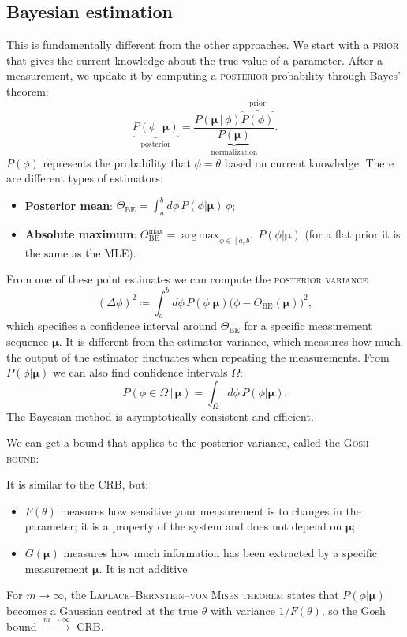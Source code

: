 \documentclass[11pt,a4paper]{article}
\newcommand{\boxedeq}[1]{%
  \par\vspace{0.4\baselineskip}%
  {\centering\keybox{$\displaystyle #1$}\par}%
  \vspace{0.4\baselineskip}}
\newcommand{\est}{\Theta}                 %
\newcommand{\vmu}{\bm{\mu}}               %
\newcommand{\term}[1]{\textsc{#1}}
\begin{document}
\subsection{Bayesian estimation}
This is fundamentally different from the other approaches. We start with a \term{prior} that gives the current knowledge about the true value of a parameter. After a measurement, we update it by computing a \term{posterior} probability through Bayes' theorem:
\[
  \underbrace{P(\phi\,|\,\vmu)}_{\text{posterior}} = \frac{P(\vmu\,|\,\phi)\overbrace{P(\phi)}^{\text{prior}}}{\underbrace{P(\vmu)}_{\text{normalization}}} .
\]
$P(\phi)$ represents the probability that $\phi=\theta$ based on current knowledge. There are different types of estimators:
\begin{itemize}
  \item \textbf{Posterior mean}: $\displaystyle \bar\est_{\text{BE}} = \int_a^b d\phi\,P(\phi|\vmu)\,\phi$;
  \item \textbf{Absolute maximum}: $\displaystyle \est^{\max}_{\text{BE}} = \operatorname*{arg\,max}_{\phi\in[a,b]} P(\phi|\vmu)$ (for a flat prior it is the same as the MLE).
\end{itemize}
From one of these point estimates we can compute the \term{posterior variance}
\[
  (\Delta\phi)^2 \coloneqq \int_a^b d\phi\,P(\phi|\vmu)\bigl(\phi-\est_{\text{BE}}(\vmu)\bigr)^2,
\]
which specifies a confidence interval around $\est_{\text{BE}}$ for a specific measurement sequence $\vmu$. It is different from the estimator variance, which measures how much the output of the estimator fluctuates when repeating the measurements. From $P(\phi|\vmu)$ we can also find confidence intervals $\Omega$:
\[
  P(\phi\in\Omega\,|\,\vmu) = \int_\Omega d\phi\,P(\phi|\vmu).
\]
The Bayesian method is asymptotically consistent and efficient.

We can get a bound that applies to the posterior variance, called the \term{Gosh bound}:
\boxedeq{(\Delta\phi)^2 \geq \frac{1}{G(\vmu)}, \qquad
  G(\vmu) = \int_a^b d\phi\,\frac{1}{P(\phi|\vmu)}\left(\frac{dP(\phi|\vmu)}{d\phi}\right)^2}
It is similar to the CRB, but:
\begin{itemize}
  \item $F(\theta)$ measures how sensitive your measurement is to changes in the parameter; it is a property of the system and does not depend on $\vmu$;
  \item $G(\vmu)$ measures how much information has been extracted by a specific measurement $\vmu$. It is not additive.
\end{itemize}
For $m\to\infty$, the \term{Laplace--Bernstein--von Mises theorem} states that $P(\phi|\vmu)$ becomes a Gaussian centred at the true $\theta$ with variance $1/F(\theta)$, so the Gosh bound $\xrightarrow{m\to\infty}$ CRB.
\end{document}
